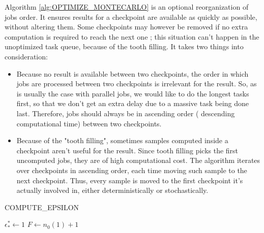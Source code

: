 \documentclass[./thesis.tex]{subfiles}
\begin{document}
Algorithm \ref{alg:OPTIMIZE_MONTECARLO} is an optional reorganization of jobs order. It ensures results for a checkpoint are available as quickly as possible, without altering them. Some checkpoints may however be removed if no extra computation is required to reach the next one ; this situation can't happen in the unoptimized task queue, because of the tooth filling. It takes two things into consideration:
\begin{itemize}
\item
Because no result is available between two checkpoints, the order in which jobs are processed between two checkpoints is irrelevant for the result. So, as is usually the case with parallel jobs, we would like to do the longest tasks first, so that we don't get an extra delay due to a massive task being done last. Therefore, jobs should always be in ascending order ( descending computational time) between two checkpoints.
\item
Because of the "tooth filling", sometimes samples computed inside a checkpoint aren't useful for the result. Since tooth filling picks the first uncomputed jobs, they are of high computational cost. The algorithm iterates over checkpoints in ascending order, each time moving such sample to the next checkpoint. Thus, every sample is moved to the first checkpoint it's actually involved in, either deterministically or stochastically.
\end{itemize}





\begin{algorithm}
	\label{COMPUTE_EPSILON}
	\caption{COMPUTE\_EPSILON}
		\KwResult{ $\tilde \epsilon$}
		$\epsilon^*_* \gets 1$ \;
		$F \gets n_0(1)+1$ \;		
\end{algorithm}
\end{document}
